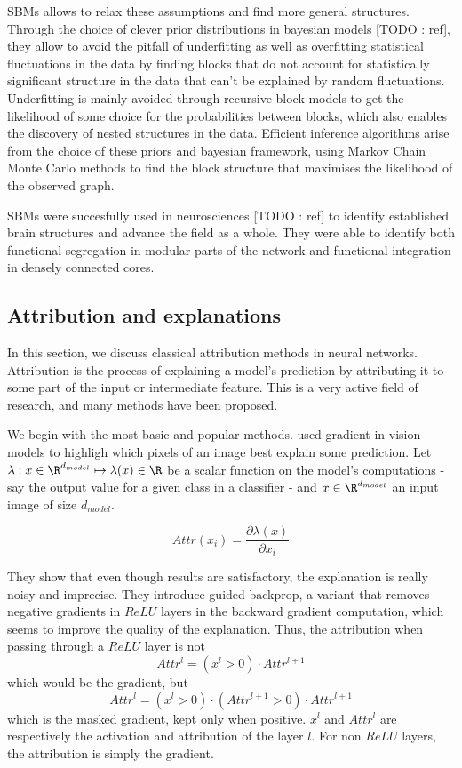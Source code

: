 \documentclass{article}
\begin{document}
SBMs allows to relax these assumptions and find more general structures. Through the choice of clever prior distributions in bayesian models [TODO : ref], they allow to avoid the pitfall of underfitting as well as overfitting statistical fluctuations in the data by finding blocks that do not account for statistically significant structure in the data that can't be explained by random fluctuations. Underfitting is mainly avoided through recursive block models to get the likelihood of some choice for the probabilities between blocks, which also enables the discovery of nested structures in the data. Efficient inference algorithms arise from the choice of these priors and bayesian framework, using Markov Chain Monte Carlo methods to find the block structure that maximises the likelihood of the observed graph.

SBMs were succesfully used in neurosciences [TODO : ref] to identify established brain structures and advance the field as a whole. They were able to identify both functional segregation in modular parts of the network and functional integration in densely connected cores.

\subsection{Attribution and explanations}
\label{sec:attribution}

In this section, we discuss classical attribution methods in neural networks. Attribution is the process of explaining a model's prediction by attributing it to some part of the input or intermediate feature. This is a very active field of research, and many methods have been proposed.

We begin with the most basic and popular methods. \citet{springenberg2015strivingGuidedBackprop} used gradient in vision models to highligh which pixels of an image best explain some prediction. Let $\lambda : x \in \R^{d_{model}} \mapsto \lambda(x) \in \R$ be a scalar function on the model's computations - say the output value for a given class in a classifier - and $x \in \R^{d_{model}}$ an input image of size $d_{model}$.

$$ Attr(x_i) = \frac{\partial \lambda(x)}{\partial x_i} $$

They show that even though results are satisfactory, the explanation is really noisy and imprecise. They introduce guided backprop, a variant that removes negative gradients in $ReLU$ layers in the backward gradient computation, which seems to improve the quality of the explanation.
Thus, the attribution when passing through a $ReLU$ layer is not
$$ Attr^l = (x^l > 0) \cdot Attr^{l+1} $$
which would be the gradient, but
$$ Attr^l = (x^l > 0) \cdot (Attr^{l+1} > 0) \cdot Attr^{l+1} $$
which is the masked gradient, kept only when positive. $x^l$ and $Attr^l$ are respectively the activation and attribution of the layer $l$. For non $ReLU$ layers, the attribution is simply the gradient.
\end{document}

